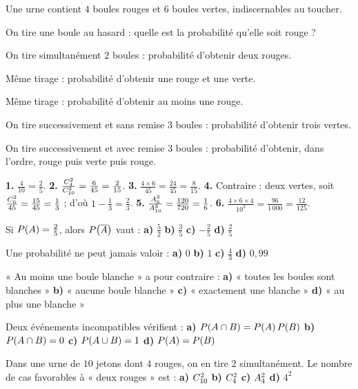 \begin{entrainement}
Une urne contient $4$ boules rouges et $6$ boules vertes, indiscernables au
toucher.

\exo[\niveau{1}] On tire une boule au hasard : quelle est la probabilité
qu'elle soit rouge ?

\exo[\niveau{2}] On tire simultanément $2$ boules : probabilité d'obtenir
deux rouges.

\exo[\niveau{2}] Même tirage : probabilité d'obtenir une rouge et une verte.

\exo[\niveau{2}] Même tirage : probabilité d'obtenir au moins une rouge.

\exo[\niveau{3}] On tire successivement et sans remise $3$ boules :
probabilité d'obtenir trois vertes.

\exo[\niveau{3}] On tire successivement et avec remise $3$ boules :
probabilité d'obtenir, dans l'ordre, rouge puis verte puis rouge.
\end{entrainement}

\begin{corrige}
\textbf{1.} $\frac{4}{10} = \frac25$.
\textbf{2.} $\frac{\combi{2}{4}}{\combi{2}{10}} = \frac{6}{45}
= \frac{2}{15}$.
\textbf{3.} $\frac{4\times6}{45} = \frac{24}{45} = \frac{8}{15}$.
\textbf{4.} Contraire : deux vertes, soit $\frac{\combi{2}{6}}{45}
= \frac{15}{45} = \frac13$ ; d'où $1-\frac13 = \frac23$.
\textbf{5.} $\frac{\arrang{3}{6}}{\arrang{3}{10}} = \frac{120}{720}
= \frac16$.
\textbf{6.} $\frac{4\times6\times4}{10^{3}} = \frac{96}{1\,000}
= \frac{12}{125}$.
\end{corrige}

\begin{qcm}
\exo Si $\proba{A} = \frac25$, alors $\proba{\evtc{A}}$ vaut :
\textbf{a)} $\frac52$ \quad \textbf{b)} $\frac35$ \quad
\textbf{c)} $-\frac25$ \quad \textbf{d)} $\frac25$ 

\exo Une probabilité ne peut jamais valoir :
\textbf{a)} $0$ \quad \textbf{b)} $1$ \quad \textbf{c)} $\frac{4}{3}$ \quad
\textbf{d)} $0{,}99$ 

\exo « Au moins une boule blanche » a pour contraire :
\textbf{a)} « toutes les boules sont blanches » \quad
\textbf{b)} « aucune boule blanche » \quad
\textbf{c)} « exactement une blanche » \quad
\textbf{d)} « au plus une blanche » 

\exo Deux événements incompatibles vérifient :
\textbf{a)} $\proba{A \cap B} = \proba{A}\proba{B}$ \quad
\textbf{b)} $\proba{A \cap B} = 0$ \quad
\textbf{c)} $\proba{A \cup B} = 1$ \quad
\textbf{d)} $\proba{A} = \proba{B}$ 

\exo Dans une urne de $10$ jetons dont $4$ rouges, on en tire $2$
simultanément. Le nombre de cas favorables à « deux rouges » est :
\textbf{a)} $\combi{2}{10}$ \quad \textbf{b)} $\combi{2}{4}$ \quad
\textbf{c)} $\arrang{2}{4}$ \quad \textbf{d)} $4^{2}$ 
\end{qcm}

